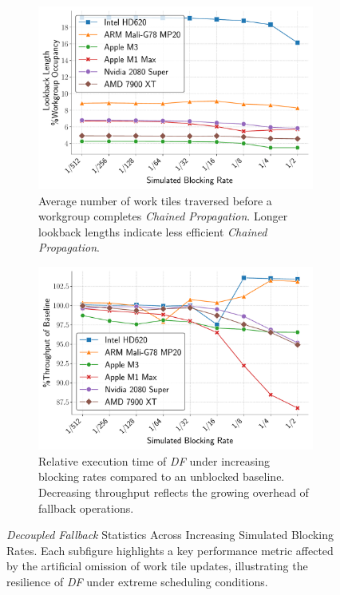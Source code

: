 \documentclass[acmsmall, manuscript, screen, review, anonymous]{acmart}
\begin{document}
\begin{figure}
  \vspace{0.2em}

  \begin{subfigure}[t]{0.48\linewidth}
    \centering
    \includegraphics[width=\linewidth]{graphics/lookbackLength_plot.pdf}
    \caption{Average number of work tiles traversed before a workgroup completes \emph{Chained Propagation}. Longer lookback lengths indicate less efficient \emph{Chained Propagation}.\label{fig:lookback_length}}
  \end{subfigure}\hfill
  \begin{subfigure}[t]{0.48\linewidth}
    \centering
    \includegraphics[width=\linewidth]{graphics/time_plot.pdf}
    \caption{Relative execution time of \emph{DF} under increasing blocking rates compared to an unblocked baseline. Decreasing throughput reflects the growing overhead of fallback operations.\label{fig:execution_time}}
  \end{subfigure}

  \caption{\emph{Decoupled Fallback} Statistics Across Increasing Simulated Blocking Rates. Each subfigure highlights a key performance metric affected by the artificial omission of work tile updates, illustrating the resilience of \emph{DF} under extreme scheduling conditions.}
  \label{fig:vertical_images}
\end{figure}
\end{document}
